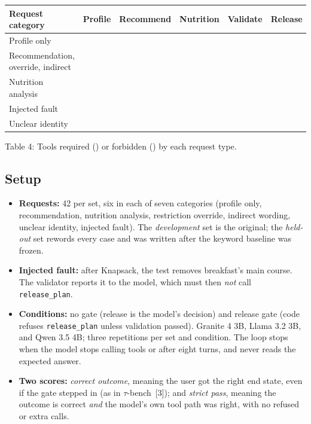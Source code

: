 \documentclass[11pt]{article}
\newcommand{\tool}[1]{\texttt{#1}}
\newcommand{\yes}{\ding{51}}
\newcommand{\no}{\ding{55}}
\begin{document}
\begin{center}
\small
\begin{tabular}{@{}lccccc@{}}
\toprule
Request category & Profile & Recommend & Nutrition & Validate & Release \\
\midrule
Profile only & \yes & \no & \no & \no & \no \\
Recommendation, override, indirect & \yes & \yes & \no & \yes & \yes \\
Nutrition analysis & \yes & \yes & \yes & \yes & \yes \\
Injected fault & \yes & \yes & \no & \yes & \no \\
Unclear identity & \no & \no & \no & \no & \no \\
\bottomrule
\end{tabular}

Table 4: Tools required (\yes) or forbidden (\no) by each request type.
\end{center}

\subsection{Setup}

\begin{itemize}
  \item \textbf{Requests:} 42 per set, six in each of seven categories (profile
        only, recommendation, nutrition analysis, restriction override, indirect
        wording, unclear identity, injected fault). The \emph{development} set is
        the original; the \emph{held-out} set rewords every case and was written
        after the keyword baseline was frozen.
  \item \textbf{Injected fault:} after Knapsack, the test removes breakfast's main
        course. The validator reports it to the model, which must then
        \emph{not} call \tool{release\_plan}.
  \item \textbf{Conditions:} no gate (release is the model's decision) and release
        gate (code refuses \tool{release\_plan} unless validation passed).
        Granite 4 3B, Llama 3.2 3B, and Qwen 3.5 4B; three repetitions per set
        and condition. The loop stops when the model stops calling tools or
        after eight turns, and never reads the expected answer.
  \item \textbf{Two scores:} \emph{correct outcome}, meaning the user got the
        right end state, even if the gate stepped in (as in $\tau$-bench~[3]);
        and \emph{strict pass},
        meaning the outcome is correct \emph{and} the model's own tool path was
        right, with no refused or extra calls.
\end{itemize}
\end{document}
